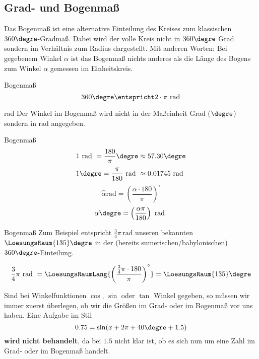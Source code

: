 
\subsection{Grad- und Bogenmaß}


Das Bogenmaß ist eine alternative Einteilung des Kreises zum
klassischen $360\degre$-Gradmaß. Dabei wird der volle Kreis nicht in
$360\degre$ Grad sondern im Verhältnis zum Radius dargestellt. Mit
anderen Worten: Bei gegebenem Winkel $\alpha$ ist das Bogenmaß nichts
anderes als die Länge des Bogens zum Winkel $\alpha$ gemessen im Einheitskreis.


\begin{definition}{Bogenmaß}{}
$$360\degre \entspricht 2\cdot\pi \text{\,\,rad}$$
\end{definition}

\begin{bemerkung}{rad}{}
Der Winkel im Bogenmaß wird nicht in der Maßeinheit Grad (${}\degre$)
sondern in $\text{rad}$ angegeben.
\end{bemerkung}

\begin{gesetz}{Bogenmaß}{}
$$1 \text{ rad } = \frac{180}{\pi}\degre \approx 57.30\degre$$
$$1\degre = \frac{\pi}{180} \text{ rad } \approx 0.01745 \text{ rad }$$
$$\stackrel{\frown}{\alpha} \text{rad} = \left(\frac{\alpha\cdot{}180}{\pi}\right)^\circ$$
$$\alpha\degre = \left(\frac{\alpha\pi}{180}\right) \text{ rad }$$  
\end{gesetz}
\newpage
\begin{beispiel}{Bogenmaß}{}
 Zum Beispiel entspricht
$\frac{3}{4}\pi\,\text{rad}$ unseren bekannten $\LoesungsRaum{135}\degre$ in der
(bereits sumerischen/babylonischen) $360\degre$-Einteilung.

 $$\frac34\pi \text{ rad } = \LoesungsRaumLang{\left(\frac{\frac34\pi\cdot{}180}{\pi}\right)^\circ} = \LoesungsRaum{135}\degre$$
\end{beispiel}

\begin{bemerkung}{}{}
  Sind bei Winkelfunktionen $\cos$, $\sin$ oder $\tan$ Winkel gegeben,
  so müssen wir immer zuerst überlegen, ob wir die Größen im Grad-
  oder im Bogenmaß vor uns haben.
  Eine Aufgabe im Stil
  $$0.75 = \sin(x + 2\pi + 40\degre + 1.5)$$
  \textbf{wird} \textbf{nicht behandelt}, da bei $1.5$ nicht klar ist, ob es sich nun um eine Zahl im Grad- oder im Bogenmaß handelt.
\end{bemerkung}%


